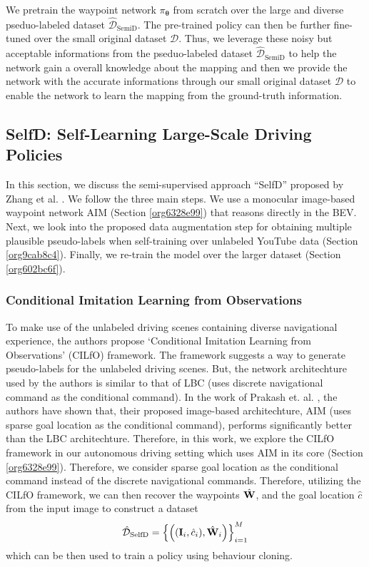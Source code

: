 \documentclass[letterpaper, 12pt]{book}
\theoremstyle{definition}
\theoremstyle{definition}
\theoremstyle{definition}
\theoremstyle{definition}
\theoremstyle{definition}
\newcommand{\vth}{\boldsymbol{\theta}}
\begin{document}
We pretrain the waypoint network \(\pi_{\vth}\) from scratch over the large and
diverse pseduo-labeled dataset \(\hat{\mathcal{D}}_{\text{SemiD}}\). The pre-trained policy
can then be further fine-tuned over the small original dataset \(\mathcal{D}\). Thus, we
leverage these noisy but acceptable informations from the pseduo-labeled dataset
\(\hat{\mathcal{D}}_{\text{SemiD}}\) to help the network gain a overall knowledge about the
mapping and then we provide the network with the accurate informations through
our small original dataset \(\mathcal{D}\) to enable the network to learn the mapping
from the ground-truth information.

\subsection{SelfD: Self-Learning Large-Scale Driving Policies}
\label{sec:orge69b40f}
In this section, we discuss the semi-supervised approach ``SelfD'' proposed
by Zhang et al. \cite{Zhang2022a}. We follow the three main steps. We use a
monocular image-based waypoint network AIM (Section \ref{org6328e99}) that reasons
directly in the BEV. Next, we look into the proposed data augmentation step
for obtaining multiple plausible pseudo-labels when self-training over
unlabeled YouTube data (Section \ref{org9cab8c4}). Finally, we re-train the model
over the larger dataset (Section \ref{org602bc6f}).

\subsubsection{Conditional Imitation Learning from Observations}
\label{sec:org5b18c05}
To make use of the unlabeled driving scenes containing diverse navigational
experience, the authors propose `Conditional Imitation Learning from
Observations' (CILfO) \cite{Zhang2022a} framework. The framework suggests a way
to generate pseudo-labels for the unlabeled driving scenes. But, the network
architechture used by the authors is similar to that of LBC \cite{Chen2019}
(uses discrete navigational command as the conditional command). In the work of
Prakash et. al. \cite{Prakash2021}, the authors have shown that, their proposed
image-based architechture, AIM (uses sparse goal location as the conditional
command), performs significantly better than the LBC architechture. Therefore,
in this work, we explore the CILfO framework in our autonomous driving setting
which uses AIM in its core (Section \ref{org6328e99}). Therefore, we consider sparse goal
location as the conditional command instead of the discrete navigational
commands. Therefore, utilizing the CILfO framework, we can then recover the
waypoints \(\hat{\textbf W}\), and the goal location \(\hat{c}\) from the input
image to construct a dataset \[\hat{\mathcal{D}}_{\text{SelfD}}=\left\lbrace \left( (\textbf I_{i}, \hat
c_{i}), \hat{\textbf W}_{i} \right) \right\rbrace_{i=1}^{M}\] which can be then used to train a policy
using behaviour cloning.
\end{document}
